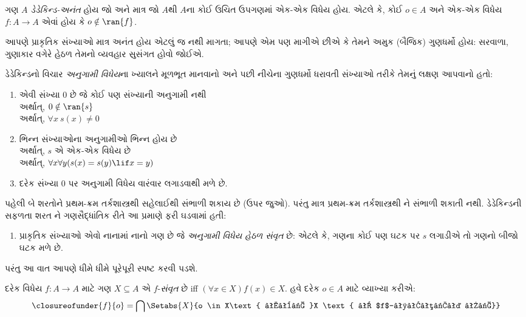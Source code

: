 \begin{defn}
ગણ $A$ \emph{ડેડેકિન્ડ-અનંત} હોય જો અને માત્ર જો $A$થી $A$ના કોઈ
ઉચિત ઉપગણમાં એક-એક વિધેય હોય. એટલે કે, કોઈ $o \in A$ અને
એક-એક વિધેય $f \colon A \to A$ એવાં હોય કે $o \notin \ran{f}$.
\end{defn}
\endgroup

\begingroup
\makeatletter{}\makeatother

\label{guunit:OLP-0051}


આપણે પ્રાકૃતિક સંખ્યાઓ માત્ર અનંત હોય એટલું જ નથી માગતા; આપણે એમ પણ
માગીએ છીએ કે તેમને અમુક (બૈજિક) ગુણધર્મો હોય: સરવાળા, ગુણાકાર વગેરે
હેઠળ તેમનો વ્યવહાર સુસંગત હોવો જોઈએ.

ડેડેકિન્ડનો વિચાર \emph{અનુગામી વિધેય}ના ખ્યાલને મૂળભૂત માનવાનો અને
પછી નીચેના ગુણધર્મો ધરાવતી સંખ્યાઓ તરીકે તેમનું લક્ષણ આપવાનો હતો:
\begin{enumerate}
	\item એવી સંખ્યા $0$ છે જે કોઈ પણ સંખ્યાની અનુગામી નથી
	\\અર્થાત્, $0 \notin \ran{s}$
	\\અર્થાત્, $\forall x\ s(x) \neq 0$
	\item ભિન્ન સંખ્યાઓના અનુગામીઓ ભિન્ન હોય છે
	\\અર્થાત્, $s$ એ એક-એક વિધેય છે
	\\અર્થાત્, $\forall x \forall y (s(x) = s(y) \lif x = y)$
	\item{} દરેક સંખ્યા $0$ પર અનુગામી
	વિધેય વારંવાર લગાડવાથી મળે છે.
\end{enumerate}
પહેલી બે શરતોને પ્રથમ-ક્રમ તર્કશાસ્ત્રથી સહેલાઈથી સંભાળી શકાય છે
(ઉપર જુઓ). પરંતુ માત્ર પ્રથમ-ક્રમ તર્કશાસ્ત્રથી
ને સંભાળી શકાતી નથી. ડેડેકિન્ડની સફળતા
શરત ને ગણસૈદ્ધાંતિક રીતે આ પ્રમાણે ફરી
ઘડવામાં હતી:
\begin{enumerate}
	\item[3$'$.] પ્રાકૃતિક સંખ્યાઓ એવો નાનામાં નાનો ગણ છે જે
	\emph{અનુગામી વિધેય હેઠળ સંવૃત} છે: એટલે કે, ગણના કોઈ પણ
	ઘટક પર $s$ લગાડીએ તો ગણનો બીજો ઘટક મળે છે.
\end{enumerate}
પરંતુ આ વાત આપણે ધીમે ધીમે પૂરેપૂરી સ્પષ્ટ કરવી પડશે.

\begin{defn}
	દરેક વિધેય $f \colon A \to A$ માટે ગણ $X \subseteq A$ એ
	$f$-\emph{સંવૃત} છે {iff} $(\forall x \in X)f(x) \in X$.
	હવે દરેક $o \in A$ માટે વ્યાખ્યા કરીએ:
	$$\closureofunder{f}{o} = \bigcap\Setabs{X}{o \in X\text{ અને }X
\text{ એ $f$-સંવૃત છે}}$$
\end{defn}

